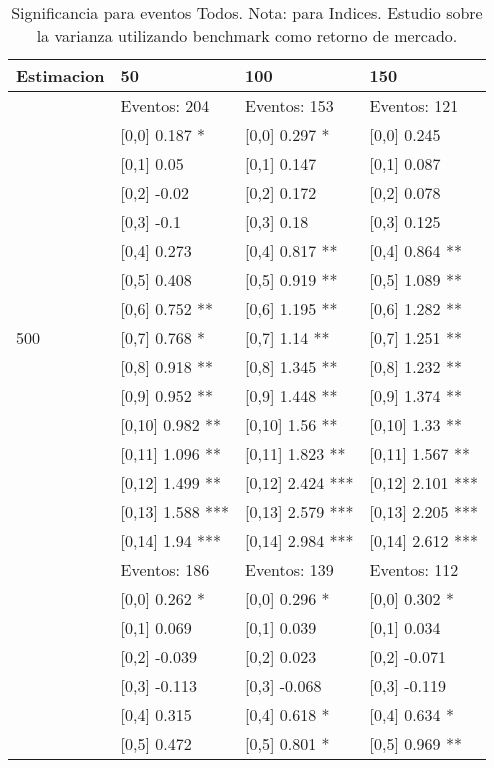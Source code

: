 \begin{table}

\caption{Significancia para eventos Todos. Nota: para Indices. Estudio sobre la varianza utilizando benchmark como retorno de mercado.}
\centering
\begin{tabular}[t]{llll}
\toprule
Estimacion & 50 & 100 & 150\\
\midrule
 & Eventos:  204 & Eventos:  153 & Eventos:  121\\
 & {}[0,0] 0.187 * & {}[0,0] 0.297 * & {}[0,0] 0.245\\
 & {}[0,1] 0.05 & {}[0,1] 0.147 & {}[0,1] 0.087\\
 & {}[0,2] -0.02 & {}[0,2] 0.172 & {}[0,2] 0.078\\
 & {}[0,3] -0.1 & {}[0,3] 0.18 & {}[0,3] 0.125\\
\addlinespace
 & {}[0,4] 0.273 & {}[0,4] 0.817 ** & {}[0,4] 0.864 **\\
 & {}[0,5] 0.408 & {}[0,5] 0.919 ** & {}[0,5] 1.089 **\\
 & {}[0,6] 0.752 ** & {}[0,6] 1.195 ** & {}[0,6] 1.282 **\\
500 & {}[0,7] 0.768 * & {}[0,7] 1.14 ** & {}[0,7] 1.251 **\\
 & {}[0,8] 0.918 ** & {}[0,8] 1.345 ** & {}[0,8] 1.232 **\\
\addlinespace
 & {}[0,9] 0.952 ** & {}[0,9] 1.448 ** & {}[0,9] 1.374 **\\
 & {}[0,10] 0.982 ** & {}[0,10] 1.56 ** & {}[0,10] 1.33 **\\
 & {}[0,11] 1.096 ** & {}[0,11] 1.823 ** & {}[0,11] 1.567 **\\
 & {}[0,12] 1.499 ** & {}[0,12] 2.424 *** & {}[0,12] 2.101 ***\\
 & {}[0,13] 1.588 *** & {}[0,13] 2.579 *** & {}[0,13] 2.205 ***\\
\addlinespace
 & {}[0,14] 1.94 *** & {}[0,14] 2.984 *** & {}[0,14] 2.612 ***\\
 & Eventos:  186 & Eventos:  139 & Eventos:  112\\
 & {}[0,0] 0.262 * & {}[0,0] 0.296 * & {}[0,0] 0.302 *\\
 & {}[0,1] 0.069 & {}[0,1] 0.039 & {}[0,1] 0.034\\
 & {}[0,2] -0.039 & {}[0,2] 0.023 & {}[0,2] -0.071\\
\addlinespace
 & {}[0,3] -0.113 & {}[0,3] -0.068 & {}[0,3] -0.119\\
 & {}[0,4] 0.315 & {}[0,4] 0.618 * & {}[0,4] 0.634 *\\
 & {}[0,5] 0.472 & {}[0,5] 0.801 * & {}[0,5] 0.969 **\\

\end{tabular}
\end{table}
